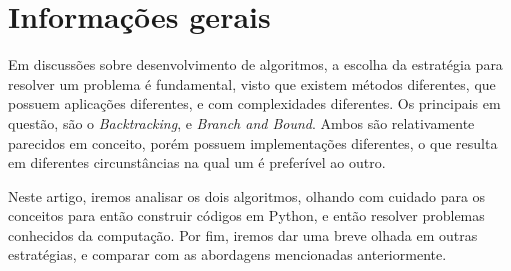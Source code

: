 \section{Informações gerais}

Em discussões sobre desenvolvimento de algoritmos, a escolha da estratégia para 
resolver um problema é fundamental, visto que existem métodos diferentes, que 
possuem aplicações diferentes, e com complexidades diferentes. Os principais
em questão, são o \emph{Backtracking}, e \emph{Branch and Bound}. Ambos são relativamente
parecidos em conceito, porém possuem implementações diferentes, o que resulta em diferentes
circunstâncias na qual um é preferível ao outro.

Neste artigo, iremos analisar os dois algoritmos, olhando com cuidado para os conceitos 
para então construir códigos em Python, e então resolver problemas conhecidos da computação. Por fim, 
iremos dar uma breve olhada em outras estratégias, e comparar com as abordagens mencionadas anteriormente.